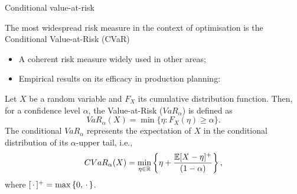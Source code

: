 \begin{frame}{Conditional value-at-risk}

	The \alert{most widespread risk measure} in the context of optimisation is the Conditional Value-at-Risk (CVaR)
	\vspace{-6pt}
	\begin{itemize}
		\item A \alert{coherent} risk measure widely used in other areas;
		\item Empirical results on its efficacy in production planning: {\small\cite{alem2020practical}}
	\end{itemize}
	
	\pause
	Let $X$ be a random variable and $F_X$ its cumulative distribution function. Then, for a confidence level $\alpha$, the \alert{Value-at-Risk} ($VaR_\alpha$) is defined as
	\begin{equation*}
		VaR_\alpha(X) = \min\{\eta : F_X(\eta)\ge \alpha\}.
	\end{equation*}
	\pause
	The conditional $VaR_\alpha$ represents the \alert{expectation} of $X$ in the \alert{conditional distribution} of its $\alpha$-upper tail, i.e.,
	\begin{equation*}
		CVaR_\alpha(X) = \min_{\eta \in \mathbb R}\left\{ \eta + \frac{\mathbb{E}[X - \eta]^+}{(1-\alpha)} \right \},
	\end{equation*}
	where $[\, \cdot \,]^+ = \max\left\{ 0,\,\cdot\, \right \}$.
	
\end{frame}


